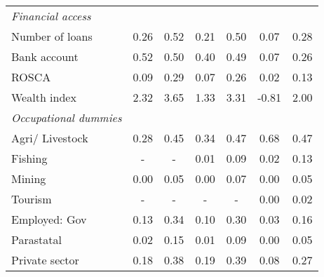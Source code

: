 \begin{table}[htbp]
\begin{tabulary}{1 \textwidth}{Lcccccc}
    \textit{Financial access } &       &       &       &       &       &  \\
    Number of loans &                     0.26  &                     0.52  &                     0.21  &                     0.50  &                      0.07  &                 0.28  \\
    Bank account &                     0.52  &                     0.50  &                     0.40  &                     0.49  &                      0.07  &                 0.26  \\
    ROSCA &                     0.09  &                     0.29  &                     0.07  &                     0.26  &                      0.02  &                 0.13  \\
    Wealth index & 2.32 & 3.65 & 1.33 & 3.31 & -0.81 & 2.00 \\
    \textit{Occupational dummies} &       &       &       &       &       &  \\
     Agri/ Livestock &                     0.28  &                     0.45  &                     0.34  &                     0.47  &                      0.68  &                 0.47  \\
     Fishing &                          -    &                          -    &                     0.01  &                     0.09  &                      0.02  &                 0.13  \\
     Mining &                     0.00  &                     0.05  &                     0.00  &                     0.07  &                      0.00  &                 0.05  \\
     Tourism &                          -    &                          -    &                          -    &                          -    &                      0.00  &                 0.02  \\
     Employed: Gov &                     0.13  &                     0.34  &                     0.10  &                     0.30  &                      0.03  &                 0.16  \\
     Parastatal &                     0.02  &                     0.15  &                     0.01  &                     0.09  &                      0.00  &                 0.05  \\
     Private sector &                     0.18  &                     0.38  &                     0.19  &                     0.39  &                      0.08  &                 0.27  \\

\end{tabulary}
\end{table}
